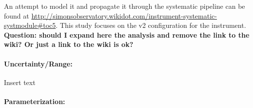 An attempt to model it and propagate it through the systematic pipeline can be found at \url{http://simonsobservatory.wikidot.com/instrument-systematic-systmodule#toc5}. This study focuses on the v2 configuration for the instrument. \textbf{Question: should I expand here the analysis and remove the link to the wiki? Or just a link to the wiki is ok?}

\paragraph{Uncertainty/Range:}
Insert text

\paragraph{Parameterization:}
